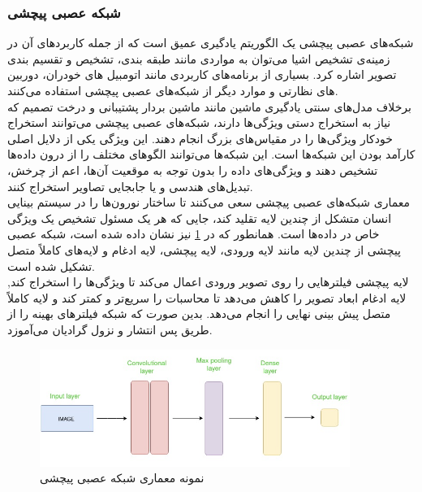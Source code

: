 \subsubsection{شبکه‌ عصبی پیچشی}
شبکه‌های عصبی پیچشی یک الگوریتم یادگیری عمیق است که از جمله کاربرد‌های آن در زمینه‌ی تشخیص اشیا می‌توان به مواردی مانند طبقه بندی، تشخیص و تقسیم بندی تصویر 
اشاره کرد. بسیاری از برنامه‌های کاربردی مانند اتومبیل های خودران، دوربین های نظارتی و موارد دیگر از شبکه‌های عصبی پیچشی استفاده می‌کنند.
\\
برخلاف مدل‌های سنتی یادگیری ماشین مانند ماشین بردار پشتیبانی و درخت‌ تصمیم
که نیاز به استخراج دستی ویژگی‌ها دارند، شبکه‌های عصبی پیچشی می‌توانند استخراج خودکار ویژگی‌ها را در مقیاس‌های بزرگ 
انجام دهند. این ویژگی یکی از دلایل اصلی کارآمد بودن این شبکه‌ها است. این شبکه‌ها می‌توانند الگوهای مختلف را از درون داده‌ها تشخیص دهند و ویژگی‌های داده را بدون توجه به موقعیت آن‌ها، اعم از چرخش، تبدیل‌‌های هندسی و یا جابجایی تصاویر استخراج کنند.
\\
معماری شبکه‌های عصبی پیچشی سعی می‌کنند تا ساختار نورون‌ها را در سیستم بینایی انسان متشکل از چندین لایه تقلید کند، جایی که هر یک مسئول تشخیص یک ویژگی خاص در داده‌ها است. 
همانطور که در 
\cref{cnn_arch}
نیز نشان داده شده است، شبکه عصبی پیچشی از چندین لایه مانند لایه ورودی، لایه پیچشی، لایه ادغام  و لایه‌های کاملاً متصل تشکیل شده است.
\\
لایه پیچشی فیلترهایی را روی تصویر ورودی اعمال می‌کند تا ویژگی‌ها را استخراج کند, لایه ادغام ابعاد تصویر را کاهش می‌دهد تا محاسبات را سریع‌تر و کمتر کند و لایه کاملاً متصل پیش بینی نهایی را انجام می‌دهد. بدین صورت که شبکه فیلترهای بهینه را از طریق پس انتشار
و نزول گرادیان
می‌آموزد.


\begin{figure}[h]
    \centering
    \includegraphics[width=0.9\textwidth]{CNN_arch.png}
    \caption[نمونه معماری شبکه عصبی پیچشی]{نمونه معماری شبکه عصبی پیچشی \cite{Introduc84:online}}\label{cnn_arch}
\end{figure}


